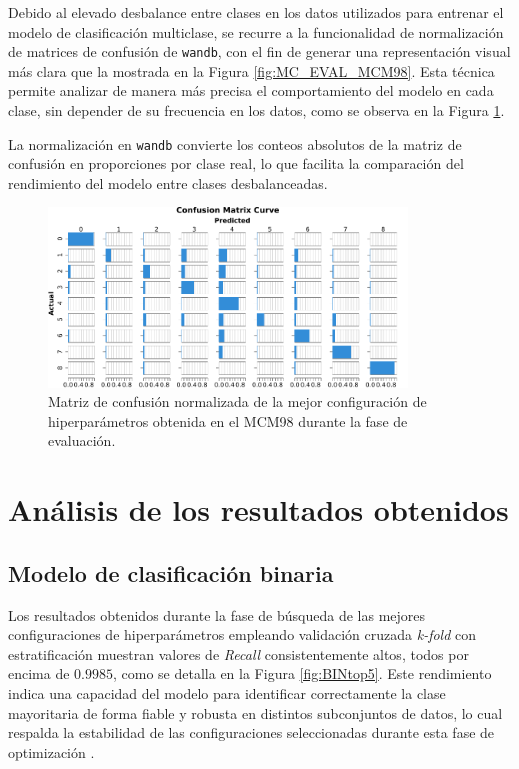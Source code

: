 Debido al elevado desbalance entre clases en los datos utilizados para entrenar el modelo de clasificación multiclase, se recurre a la funcionalidad de normalización de matrices de confusión de \texttt{wandb}, con el fin de generar una representación visual más clara que la mostrada en la Figura \ref{fig:MC_EVAL_MCM98}. Esta técnica permite analizar de manera más precisa el comportamiento del modelo en cada clase, sin depender de su frecuencia en los datos, como se observa en la Figura \ref{fig:MCNorm_EVAL_MCM98}.

La normalización en \texttt{wandb} convierte los conteos absolutos de la matriz de confusión en proporciones por clase real, lo que facilita la comparación del rendimiento del modelo entre clases desbalanceadas.

\begin{figure}[H]
    \centering
    \includegraphics[width=0.85\textwidth]{./img/evaluacion/matrices_confusion/MCNorm_EVAL_MCM98.pdf}
    \caption{Matriz de confusión normalizada de la mejor configuración de hiperparámetros obtenida en el MCM98 durante la fase de evaluación.}
    \label{fig:MCNorm_EVAL_MCM98}
\end{figure}




\section{Análisis de los resultados obtenidos} \label{sec:analEVAL}
\subsection{Modelo de clasificación binaria}

Los resultados obtenidos durante la fase de búsqueda de las mejores configuraciones de hiperparámetros empleando validación cruzada \textit{k-fold} con estratificación muestran valores de \textit{Recall} consistentemente altos, todos por encima de $0{.}9985$, como se detalla en la Figura \ref{fig:BINtop5}. Este rendimiento indica una capacidad del modelo para identificar correctamente la clase mayoritaria de forma fiable y robusta en distintos subconjuntos de datos, lo cual respalda la estabilidad de las configuraciones seleccionadas durante esta fase de optimización \cite{bergstra2012random}.


